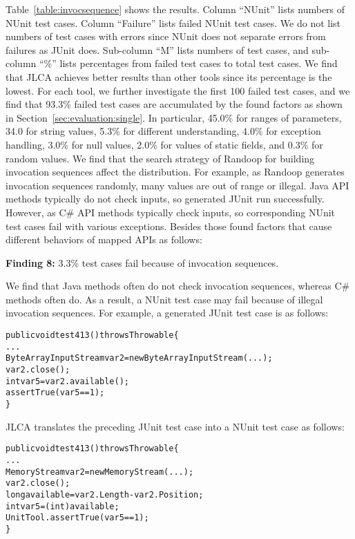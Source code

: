 Table~\ref{table:invocsequence} shows the results. Column ``NUnit'' lists numbers of NUnit test cases. Column ``Failure'' lists failed NUnit test cases. We do not list numbers of test cases with errors since NUnit does not separate errors from failures as JUnit does. Sub-column ``M'' lists numbers of test cases, and sub-column ``\%'' lists percentages from failed test cases to total test cases. We find that JLCA achieves better results than other tools since its percentage is the lowest. For each tool, we further investigate the first 100 failed test cases, and we find that 93.3\% failed test cases are accumulated by the found factors as shown in Section~\ref{sec:evaluation:single}. In particular, 45.0\% for ranges of parameters, 34.0 for string values, 5.3\% for different understanding, 4.0\% for exception handling, 3.0\% for null values, 2.0\% for values of static fields, and 0.3\% for random values. We find that the search strategy of Randoop for building invocation sequences affect the distribution. For example, as Randoop generates invocation sequences randomly, many values are out of range or illegal. Java API methods typically do not check inputs, so generated JUnit run successfully. However, as C\# API methods typically check inputs, so corresponding NUnit test cases fail with various exceptions. Besides those found factors that cause different behaviors of mapped APIs as follows:

\textbf{Finding 8:} 3.3\% test cases fail because of invocation sequences.

We find that Java methods often do not check invocation sequences, whereas C\# methods often do. As a result, a NUnit test case may fail because of illegal invocation sequences. For example, a generated JUnit test case is as follows:

\begin{CodeOut}%
\begin{alltt}
public void test413() throws Throwable\{
  ...
  ByteArrayInputStream var2=new ByteArrayInputStream(...);
  var2.close();
  int var5=var2.available();
  assertTrue(var5 == 1);
\}
\end{alltt}
\end{CodeOut}

JLCA translates the preceding JUnit test case into a NUnit test case as follows:

\begin{CodeOut}%
\begin{alltt}
public void test413() throws Throwable\{
  ...
  MemoryStream var2 = new MemoryStream(...);
  var2.close();
  long available = var2.Length - var2.Position;
  int var5 = (int) available;
  UnitTool.assertTrue(var5 == 1);
\}
\end{alltt}
\end{CodeOut}

